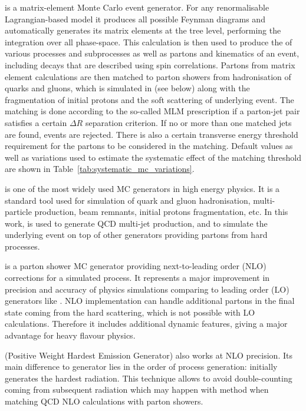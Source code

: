 \begin{description}[wide=\parindent, style=standard, labelsep=0pt]
\item [\MADGRAPH] \autocite{MadGraph} is a matrix-element Monte Carlo event generator. For any renormalisable
Lagrangian-based model it produces all possible Feynman diagrams and automatically generates its matrix elements at the
tree level, performing the integration over all phase-space. This calculation is then used to produce the \xsect of
various processes and subprocesses as well as partons and kinematics of an event, including decays that are described
using spin correlations. Partons from matrix element calculations are then matched to parton showers from hadronisation
of quarks and gluons, which is simulated in \PYTHIA (see below) along with the fragmentation of initial protons and the
soft scattering of underlying event. The matching is done according to the so-called MLM prescription \autocite{MLM} if
a parton-jet pair satisfies a certain $\Delta R$ separation criterion. If no or more than one matched jets are found,
events are rejected. There is also a certain transverse energy threshold requirement for the partons to be considered in
the matching. Default values as well as variations used to estimate the systematic effect of the matching threshold are
shown in Table~\ref{tab:systematic_mc_variations}.

\item [\PYTHIA] \autocite{Pythia,Pythia6.4} is one of the most widely used MC generators in high energy physics. It is a
standard tool used for simulation of quark and gluon hadronisation, multi-particle production, beam remnants, initial
protons fragmentation, etc. In this work, \PYTHIA is used to generate QCD multi-jet production, and to simulate the
underlying event on top of other generators providing partons from hard processes.

\item [\MCATNLO] \autocite{MCatNLO} is a parton shower MC generator providing next-to-leading order (NLO) corrections
for a simulated process. It represents a major improvement in precision and accuracy of physics simulations comparing to
leading order (LO) generators like \PYTHIA. NLO implementation can handle additional partons in the final state coming
from the hard scattering, which is not possible with LO calculations. Therefore it includes additional dynamic features,
giving a major advantage for heavy flavour physics.

\item [\POWHEG] (Positive Weight Hardest Emission Generator) \autocite{POWHEG} also works at NLO precision. Its main
difference to \MCATNLO generator lies in the order of process generation: \POWHEG initially generates the hardest
radiation. This technique allows to avoid double-counting coming from subsequent radiation which may happen with
\MCATNLO method when matching QCD NLO calculations with parton showers.

\end{description}

